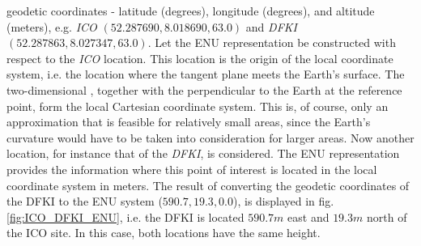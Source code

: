 \documentclass[english, master, utf8]{base/thesis_KBS}
\begin{document}
geodetic coordinates - latitude (degrees), longitude (degrees), and altitude (meters), e.g. \textit{ICO} $(52.287690, 8.018690, 63.0)$ and \textit{DFKI} $(52.287863, 8.027347, 63.0)$.
Let the ENU representation be constructed with respect to the \textit{ICO} location. This location is the origin of the local coordinate system, i.e. the location where the tangent
plane meets the Earth's surface. The two-dimensional , together with the  perpendicular to the Earth at the reference point, form
the local Cartesian coordinate system. This is, of course, only an approximation that is feasible for relatively small areas, since the Earth's curvature would have to be taken
into consideration for larger areas. Now another location, for instance that of the \textit{DFKI}, is considered. The ENU representation provides the information where this point
of interest is located in the local coordinate system in meters. The result of converting the geodetic coordinates of the DFKI to the ENU system ($590.7, 19.3, 0.0$), is displayed
in fig. \ref{fig:ICO_DFKI_ENU}, i.e. the DFKI is located $590.7 m$ east and $19.3 m$ north of the ICO site. In this case, both locations have the same height.
\end{document}
